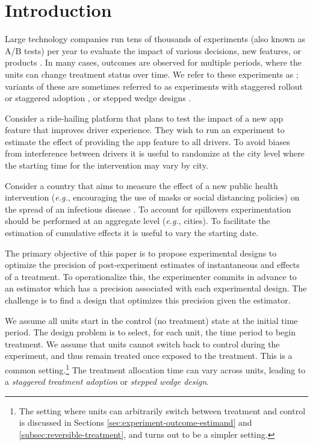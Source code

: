 \section{Introduction}\label{sec:intro}
	Large technology companies run tens of thousands of experiments (also known as A/B tests) per year to evaluate the impact of various decisions, new features, or products \citep{gupta2019top}. 
	In many cases, outcomes are observed 
  for multiple periods, where the units can change treatment status over time.  We refer to these experiments as ; variants of these are sometimes referred to as experiments with staggered rollout or staggered adoption \citep{athey2018matrix}, or stepped wedge designs \citep{hemming2015stepped}. 
	
	\begin{example}\label{ex:driver-safety}
	Consider a ride-hailing platform that plans to test the impact of a new app feature that improves driver experience. They wish to run an experiment to estimate the effect of providing the app feature to all drivers. To avoid biases from interference between drivers it is useful to randomize at the city level where the starting time for the intervention may vary by city. 
	\end{example}
	\begin{example}\label{ex:infectious-disease}
Consider a country that aims to measure the effect of a new public health intervention ({\it e.g.}, encouraging the use of masks or social distancing policies) on the spread of an infectious disease \citep{abaluck2021impact}. To account for spillovers experimentation should be performed at an aggregate level ({\it e.g.}, cities). To facilitate the estimation of cumulative effects it is useful to vary the starting date. 
\end{example}	
	
The primary objective of this paper is to propose experimental designs to optimize the precision of post-experiment estimates of instantaneous and  effects of a treatment. 
To operationalize this, the experimenter commits in advance to an estimator which  has a precision associated with each experimental design. The challenge is to find a design that optimizes this precision given the estimator.


We assume all units start in the control (no treatment) state at the initial time period. The design problem is to select, for each unit, the time period to begin treatment. We assume that units cannot switch back to control during the experiment, and thus remain treated once exposed to the treatment. This is a common setting.\footnote{The setting where units can arbitrarily switch between treatment and control is discussed in Sections \ref{sec:experiment-outcome-estimand} and \ref{subsec:reversible-treatment}, and turns out to be a simpler setting.} 
The treatment allocation time can vary across units, leading to a \emph{staggered treatment adoption} or \emph{stepped wedge design}.
    
